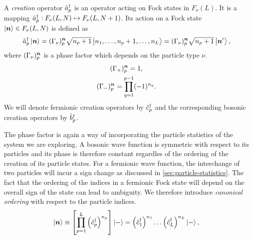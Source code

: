             \begin{definition}
                \label{def:creation_1}
                A \emph{creation} operator $\hat{a}_{p}^{\dagger}$ is an operator acting on
                Fock states in $F_{\nu}(L)$.
                It is a mapping $\hat{a}_{p}^{\dagger}: F_{\nu}(L, N) \mapsto F_{\nu}(L, N +
                1)$.
                Its action on a Fock state $\ket{\boldsymbol{n}} \in F_{\nu}(L, N)$ is
                defined as
                \begin{align}
                    \hat{a}_{p}^{\dagger}\ket{\boldsymbol{n}}
                    = (\Gamma_{\nu})^{\boldsymbol{n}}_{p}
                    \sqrt{n_p + 1}
                    \ket{n_1, \dots, n_p + 1, \dots, n_L}
                    = (\Gamma_{\nu})^{\boldsymbol{n}}_{p}
                    \sqrt{n_p + 1}
                    \ket{\boldsymbol{n}'},
                    \label{eq:general_creation}
                \end{align}
                where $(\Gamma_{\nu})^{\boldsymbol{n}}_{p}$ is a phase factor which
                depends on the particle type $\nu$.
                \begin{gather}
                    (\Gamma_{+})^{\boldsymbol{n}}_{p} = 1, \\
                    (\Gamma_{-})^{\boldsymbol{n}}_{p}
                    = \prod_{q = 1}^{p - 1} (-1)^{n_q}.
                    \label{eq:phase-fermion}
                \end{gather}
                We will denote fermionic creation operators by $\hat{c}_{p}^{\dagger}$ and the
                corresponding bosonic creation operators by $\hat{b}_{p}^{\dagger}$.
            \end{definition}
            The phase factor is again a way of incorporating the particle
            statistics of the system we are exploring.
            A bosonic wave function is symmetric with respect to its particles
            and its phase is therefore constant regardles of the ordering of the
            creation of its particle states.
            For a fermionic wave function, the interchange of two particles will
            incur a sign change as discussed in
            \autoref{sec:particle-statistics}.
            The fact that the ordering of the indices in a fermionic Fock state
            will depend on the overall sign of the state can lead to ambiguity.
            We therefore introduce \emph{canonical ordering} with respect to the
            particle indices.
            \begin{align}
                \ket{\boldsymbol{n}}
                \equiv \left[ 
                    \prod_{p = 1}^{L}
                    \left( \hat{c}_{p}^{\dagger} \right)^{n_p}
                 \right]\ket{-}
                = \left( \hat{c}_{1}^{\dagger} \right)^{n_1}\dots\left( \hat{c}_{L}^{\dagger} \right)^{n_L}\ket{-},
                \label{eq:canonical-fock-state}
            \end{align}
